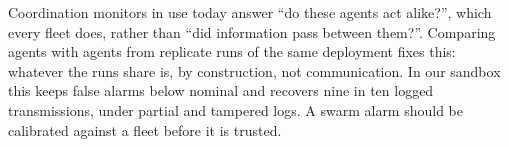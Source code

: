 Coordination monitors in use today answer ``do these agents act alike?'', which every fleet does, rather than ``did information pass between them?''. Comparing agents with agents from replicate runs of the same deployment fixes this: whatever the runs share is, by construction, not communication. In our sandbox this keeps false alarms below nominal and recovers nine in ten logged transmissions, under partial and tampered logs. A swarm alarm should be calibrated against a fleet before it is trusted.

